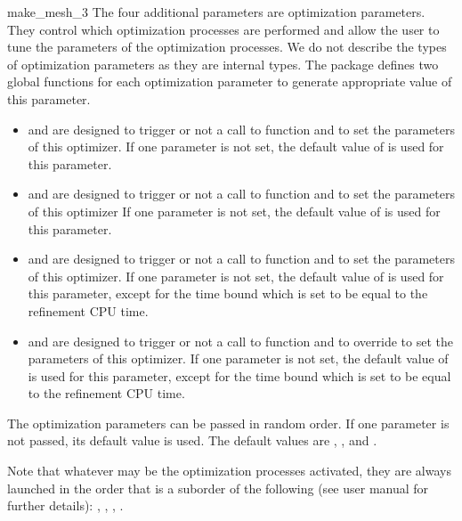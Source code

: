 \begin{ccRefFunction}{make_mesh_3}
The four additional parameters are optimization parameters.
They control which optimization processes are performed
and allow the user to tune the parameters of the optimization processes.
We do not describe  the types of optimization parameters  as they are
internal types. The package defines two global
functions for each optimization parameter
 to generate appropriate value of this parameter.

\begin{itemize}
\item {} and  are designed to
  trigger or not a call to  function and to set the
  parameters of this optimizer. If one parameter is not set, the default value of
   is used for this parameter.
\item {} and  are designed to
  trigger or not a call to  function and 
to set the  parameters of this optimizer
 If one parameter is not set, the default value of
   is used for this parameter.
\item {} and  are designed  to
  trigger or not a call to  function and 
to set the  parameters of this optimizer. If one parameter is not set, the default value of
   is used for this parameter, except for the time bound which is set to be
  equal to the refinement CPU time.
\item {} and  are designed to
  trigger or not a call to  function and  to override to set the
  parameters of this optimizer. If one parameter is not set, the default value of
   is used for this parameter, except for the time bound which is set to be
  equal to the refinement CPU time.
\end{itemize}

The optimization parameters can be passed in random order. If one parameter
is not passed, its default value is used. The default values are
, ,  and .

Note that whatever may be the optimization processes activated,
they are always launched in the order that is a suborder 
of the following (see user manual for further details):
, , , .


\end{ccRefFunction}
